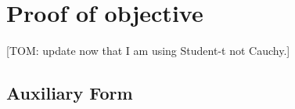 \documentclass[onecolumn,floatfix]{aastex631}
\begin{document}






\section{Proof of objective} \label{sec:proof}

[TOM: update now that I am using Student-t not Cauchy.]

\subsection{Auxiliary Form}
\end{document}
